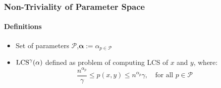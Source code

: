 \begin{frame}
	\frametitle{Non-Triviality of Parameter Space}
	\framesubtitle{Definitions}

	\begin{definition}
		\begin{itemize}
			\setlength{\itemindent}{1em}
			\item Set of parameters $\mathcal{P}$,\quad $\mathbf{\alpha} := \alpha_{p \in \mathcal{P}}$
			\item $\text{LCS}^\gamma(\mathbf{\alpha})$ defined as problem of computing LCS of $x$ and $y$, where:
			\begin{displaymath}
				\frac{n^{\alpha_p}}{\gamma} \leq p(x,y) \leq n^{\alpha_p}\gamma, \quad \text{for all } p \in \mathcal{P}
			\end{displaymath}
		\end{itemize}
	\end{definition}
\end{frame}
